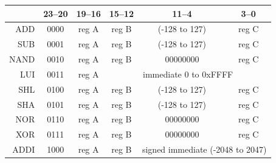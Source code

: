 \documentclass[10pt,a4paper]{article}
\theoremstyle{definition}%
\begin{document}
\begin{table}[ht!]
\begin{center}
		\begin{tabular}{r|c|c|c|c|c}%
		\toprule
		\diaghead{bourage~}{Instr}{ bit}	& 23--20  & 19--16  & {15--12}  & 11--4  & {3--0}\\
		\midrule
		ADD & 0000 & reg A & reg B & (-128 to 127) & {reg C} \\
		SUB & 0001 & reg A & reg B & (-128 to 127) & {reg C} \\
		NAND & 0010 & reg A & reg B & 00000000 & {reg C} \\ \cmidrule{4-6} %
		LUI & 0011 & reg A & \multicolumn{3}{c}{immediate 0 to 0xFFFF} \\ %
		\cmidrule{4-6}
		SHL & 0100 & reg A & reg B & (-128 to 127) & {reg C} \\
		SHA & 0101 & reg A & reg B & (-128 to 127) & {reg C} \\
		NOR & 0110 & reg A & reg B & 00000000 & {reg C} \\
		XOR & 0111 & reg A & reg B & 00000000 & {reg C} \\
		\cmidrule{5-6}
		ADDI & 1000 & reg A & reg B & \multicolumn{2}{c}{signed immediate (-2048 to 2047)} \\

\end{tabular}
\end{center}
\end{table}
\end{document}
